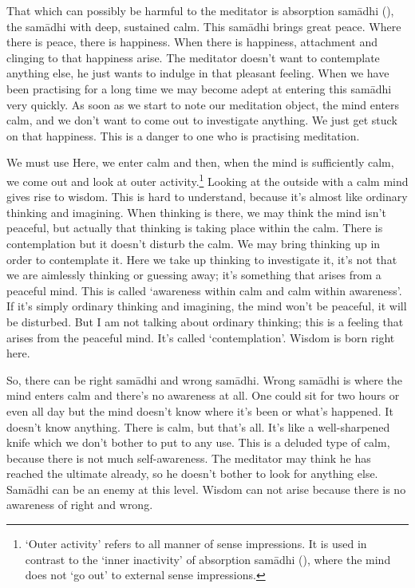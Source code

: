 That which can possibly be harmful to the meditator is absorption sam\=adhi (), the sam\=adhi with deep, sustained calm. This sam\=adhi brings great peace. Where there is peace, there is happiness. When there is happiness, attachment and clinging to that happiness arise. The meditator doesn't want to contemplate anything else, he just wants to indulge in that pleasant feeling. When we have been practising for a long time we may become adept at entering this sam\=adhi very quickly. As soon as we start to note our meditation object, the mind enters calm, and we don't want to come out to investigate anything. We just get stuck on that happiness. This is a danger to one who is practising meditation. 

We must use  Here, we enter calm and then, when the mind is sufficiently calm, we come out and look at outer activity.\footnote{`Outer activity' refers to all manner of sense impressions. It is used in contrast to the `inner inactivity' of absorption sam\=adhi (), where the mind does not `go out' to external sense impressions.} Looking at the outside with a calm mind gives rise to wisdom. This is hard to understand, because it's almost like ordinary thinking and imagining. When thinking is there, we may think the mind isn't peaceful, but actually that thinking is taking place within the calm. There is contemplation but it doesn't disturb the calm. We may bring thinking up in order to contemplate it. Here we take up thinking to investigate it, it's not that we are aimlessly thinking or guessing away; it's something that arises from a peaceful mind. This is called `awareness within calm and calm within awareness'. If it's simply ordinary thinking and imagining, the mind won't be peaceful, it will be disturbed. But I am not talking about ordinary thinking; this is a feeling that arises from the peaceful mind. It's called `contemplation'. Wisdom is born right here. 

So, there can be right sam\=adhi and wrong sam\=adhi. Wrong sam\=adhi is where the mind enters calm and there's no awareness at all. One could sit for two hours or even all day but the mind doesn't know where it's been or what's happened. It doesn't know anything. There is calm, but that's all. It's like a well-sharpened knife which we don't bother to put to any use. This is a deluded type of calm, because there is not much self-awareness. The meditator may think he has reached the ultimate already, so he doesn't bother to look for anything else. Sam\=adhi can be an enemy at this level. Wisdom can not arise because there is no awareness of right and wrong. 

